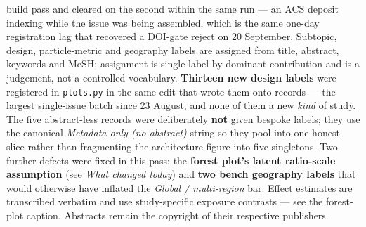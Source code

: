 \documentclass[10pt]{article}
\begin{document}
\begin{keybox}
{build pass and cleared on the second within the same run --- an ACS deposit indexing while
the issue was being assembled, which is the same one-day registration lag that recovered a
DOI-gate reject on 20 September.
Subtopic, design, particle-metric and geography labels are assigned from title, abstract,
keywords and MeSH; assignment is single-label by dominant contribution and is a judgement,
not a controlled vocabulary. \textbf{Thirteen new design labels} were registered in
\texttt{plots.py} in the same edit that wrote them onto records --- the largest single-issue
batch since 23 August, and none of them a new \textit{kind} of study. The five abstract-less
records were deliberately \textbf{not} given bespoke labels; they use the canonical
\textit{Metadata only (no abstract)} string so they pool into one honest slice rather than
fragmenting the architecture figure into five singletons. Two further defects were fixed in
this pass: the \textbf{forest plot's latent ratio-scale assumption} (see \textit{What changed
today}) and \textbf{two bench geography labels} that would otherwise have inflated the
\textit{Global / multi-region} bar. Effect estimates are transcribed verbatim and use
study-specific exposure contrasts --- see the forest-plot caption. Abstracts remain the
copyright of their respective publishers.\par}
\end{keybox}
\end{document}
